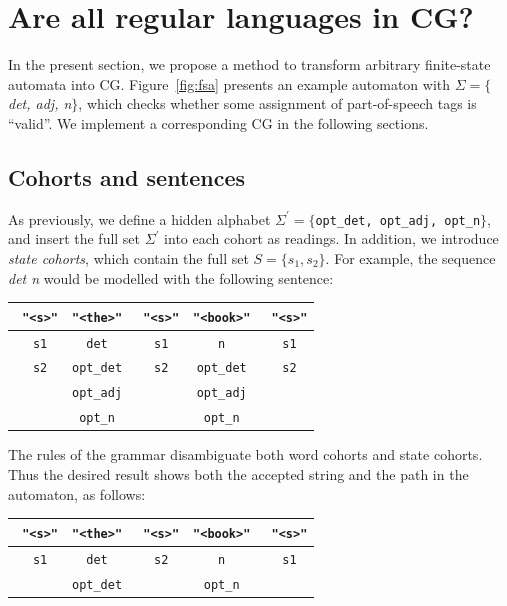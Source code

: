 \documentclass[11pt]{article}
\def\t#1{\texttt{#1}}
\def\h#1{{\tt \color{gray} #1}}
\def\swf{\h{"<s>"}}
\begin{document}
\section{Are all regular languages in CG?}
In the present section, we propose a method to transform arbitrary finite-state
automata into CG. Figure~\ref{fig:fsa} presents an example automaton with
$\Sigma = \{$\emph{det, adj, n}$\}$, which checks whether some assignment of
part-of-speech tags is ``valid''. We implement a corresponding CG in the
following sections.

\subsection{Cohorts and sentences}
As previously, we define a hidden alphabet $\Sigma^{\prime} = \{$\t{opt\_det,
  opt\_adj, opt\_n}$\}$, and insert the full set $\Sigma^{\prime}$ into each
cohort as readings. In addition, we introduce \emph{state cohorts}, which
contain the full set $S = \{s_1, s_2\}$. For example, the sequence \emph{det n}
would be modelled with the following sentence:
%
\begin{table}[h]
  \centering\small
  \begin{tabular}{c|c|c|c|c}
    \swf   & \t{"<the>"}  & \swf   & \t{"<book>"} & \swf   \\ \hline
    \h{s1} & \t{det}      & \h{s1} & \t{n}        & \h{s1} \\
    \h{s2} & \t{opt\_det} & \h{s2} & \t{opt\_det} & \h{s2} \\
           & \t{opt\_adj} &        & \t{opt\_adj} &        \\
           & \t{opt\_n}   &        & \t{opt\_n}   &        
  \end{tabular}
\end{table}
%
The rules of the grammar disambiguate both word cohorts and state cohorts. Thus
the desired result shows both the accepted string and the path in the automaton,
as follows:
%
\begin{table}[h]
  \centering\small
  \begin{tabular}{c|c|c|c|c}
    \swf   & \t{"<the>"}  & \swf   & \t{"<book>"} & \swf   \\ \hline
    \h{s1} & \t{det}      & \h{s2} & \t{n}        & \h{s1} \\
           & \t{opt\_det} &        & \t{opt\_n}   &        
  \end{tabular}
\end{table}
\end{document}
